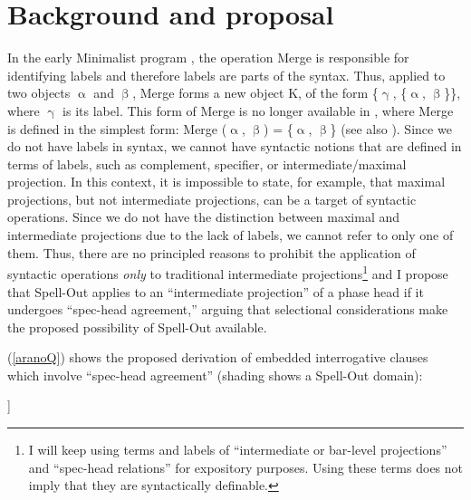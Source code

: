 \documentclass[output=paper]{langscibook}
\begin{document}
\section{Background and proposal}\label{aranosect2}
In the early Minimalist program \citep{Chomsky:1995}, the operation Merge is responsible for identifying labels and therefore labels are parts of the syntax. Thus, applied to two objects $\upalpha$ and $\upbeta$, Merge forms a new object K, of the form \{$\upgamma$, \{$\upalpha$, $\upbeta$\}\}, where $\upgamma$ is its label. This form of Merge is no longer available in \citet{Chomsky:2013, Chomsky:2015}, where Merge is defined in the simplest form: Merge ($\upalpha$, $\upbeta$) = \{$\upalpha$, $\upbeta$\} (see also \citealt{Collins:2002a}). Since we do not have labels in syntax, we cannot have syntactic notions that are defined in terms of labels, such as complement, specifier, or intermediate/maximal projection. In this context, it is impossible to state, for example, that maximal projections, but not intermediate projections, can be a target of syntactic operations. Since we do not have the distinction between maximal and intermediate projections due to the lack of labels, we cannot refer to only one of them. Thus, there are no principled reasons to prohibit the application of syntactic operations \emph{only} to traditional intermediate projections\footnote{I will keep using terms and labels of ``intermediate or bar-level projections'' and ``spec-head relations'' for expository purposes. Using these terms does not imply that they are syntactically definable.} and I propose that Spell-Out applies to an ``intermediate projection'' of a phase head if it undergoes ``spec-head agreement,'' arguing that selectional considerations make the proposed possibility of Spell-Out available.

(\ref{aranoQ}) shows the proposed derivation of embedded interrogative clauses which involve ``spec-head agreement'' (shading shows a Spell-Out domain):

\ea \label{aranoQ} {} \upshape
 [\sub{vP} wonder [ what$_\mathrm{i}$ \shade{C$_{\mathrm{Q}}$ [\sub{TP} you T$_\mathrm{\upphi}$ cook t$_\mathrm{i}$]}]]
\z 
\end{document}
